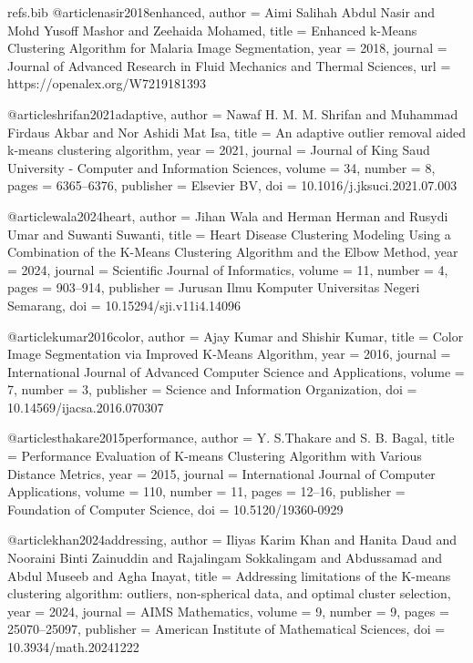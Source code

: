 \begin{filecontents*}[overwrite]{refs.bib}
@article{nasir2018enhanced,
  author = {Aimi Salihah Abdul Nasir and Mohd Yusoff Mashor and Zeehaida Mohamed},
  title = {{Enhanced k-Means Clustering Algorithm for Malaria Image Segmentation}},
  year = {2018},
  journal = {Journal of Advanced Research in Fluid Mechanics and Thermal Sciences},
  url = {https://openalex.org/W7219181393}
}

@article{shrifan2021adaptive,
  author = {Nawaf H. M. M. Shrifan and Muhammad Firdaus Akbar and Nor Ashidi Mat Isa},
  title = {{An adaptive outlier removal aided k-means clustering algorithm}},
  year = {2021},
  journal = {Journal of King Saud University - Computer and Information Sciences},
  volume = {34},
  number = {8},
  pages = {6365--6376},
  publisher = {Elsevier BV},
  doi = {10.1016/j.jksuci.2021.07.003}
}

@article{wala2024heart,
  author = {Jihan Wala and Herman Herman and Rusydi Umar and Suwanti Suwanti},
  title = {{Heart Disease Clustering Modeling Using a Combination of the K-Means Clustering Algorithm and the Elbow Method}},
  year = {2024},
  journal = {Scientific Journal of Informatics},
  volume = {11},
  number = {4},
  pages = {903--914},
  publisher = {Jurusan Ilmu Komputer Universitas Negeri Semarang},
  doi = {10.15294/sji.v11i4.14096}
}

@article{kumar2016color,
  author = {Ajay Kumar and Shishir Kumar},
  title = {{Color Image Segmentation via Improved K-Means Algorithm}},
  year = {2016},
  journal = {International Journal of Advanced Computer Science and Applications},
  volume = {7},
  number = {3},
  publisher = {Science and Information Organization},
  doi = {10.14569/ijacsa.2016.070307}
}

@article{sthakare2015performance,
  author = {Y. S.Thakare and S. B. Bagal},
  title = {{Performance Evaluation of K-means Clustering Algorithm with Various Distance Metrics}},
  year = {2015},
  journal = {International Journal of Computer Applications},
  volume = {110},
  number = {11},
  pages = {12--16},
  publisher = {Foundation of Computer Science},
  doi = {10.5120/19360-0929}
}

@article{khan2024addressing,
  author = {Iliyas Karim Khan and Hanita Daud and Nooraini Binti Zainuddin and Rajalingam Sokkalingam and Abdussamad and Abdul Museeb and Agha Inayat},
  title = {{Addressing limitations of the K-means clustering algorithm: outliers, non-spherical data, and optimal cluster selection}},
  year = {2024},
  journal = {AIMS Mathematics},
  volume = {9},
  number = {9},
  pages = {25070--25097},
  publisher = {American Institute of Mathematical Sciences},
  doi = {10.3934/math.20241222}
}


\end{filecontents*}
